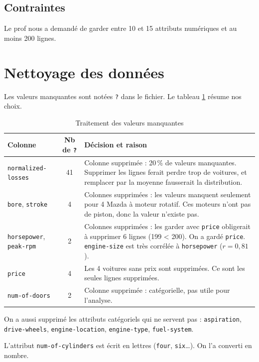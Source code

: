 \documentclass[11pt,a4paper]{article}
\newcommand{\code}[1]{\texttt{#1}}
\begin{document}
\subsection{Contraintes}

Le prof nous a demandé de garder entre 10 et 15 attributs numériques et au moins 200 lignes.

\section{Nettoyage des données}

Les valeurs manquantes sont notées \code{?} dans le fichier. Le tableau \ref{tab:suppression} résume nos choix.

\begin{table}[H]
\centering
\begin{tabularx}{\textwidth}{l c X}
\toprule
\textbf{Colonne} & \textbf{Nb de \code{?}} & \textbf{Décision et raison} \\
\midrule
\code{normalized-losses} & 41 & Colonne supprimée : 20\,\% de valeurs manquantes. Supprimer les lignes ferait perdre trop de voitures, et remplacer par la moyenne fausserait la distribution. \\
\code{bore}, \code{stroke} & 4 & Colonnes supprimées : les valeurs manquent seulement pour 4 Mazda à moteur rotatif. Ces moteurs n'ont pas de piston, donc la valeur n'existe pas. \\
\code{horsepower}, \code{peak-rpm} & 2 & Colonnes supprimées : les garder avec \code{price} obligerait à supprimer 6 lignes (199 < 200). On a gardé \code{price}. \code{engine-size} est très corrélée à \code{horsepower} ($r = 0{,}81$). \\
\code{price} & 4 & Les 4 voitures sans prix sont supprimées. Ce sont les seules lignes supprimées. \\
\code{num-of-doors} & 2 & Colonne supprimée : catégorielle, pas utile pour l'analyse. \\
\bottomrule
\end{tabularx}
\caption{Traitement des valeurs manquantes}
\label{tab:suppression}
\end{table}

On a aussi supprimé les attributs catégoriels qui ne servent pas : \code{aspiration}, \code{drive-wheels}, \code{engine-location}, \code{engine-type}, \code{fuel-system}.

L'attribut \code{num-of-cylinders} est écrit en lettres (\code{four}, \code{six}\dots). On l'a converti en nombre.
\end{document}
